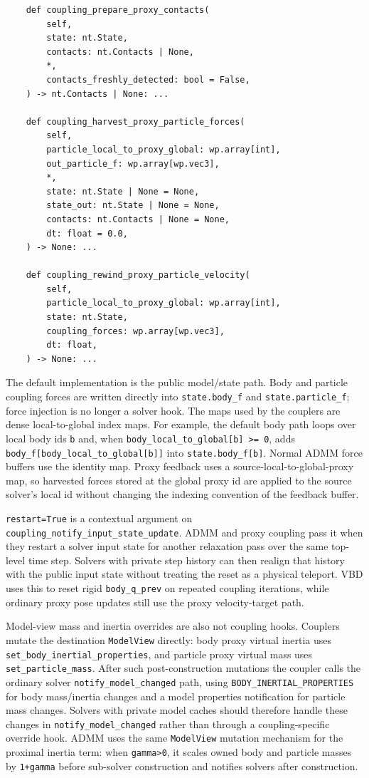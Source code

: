 \documentclass[11pt]{article}
\begin{document}
\begin{verbatim}
    def coupling_prepare_proxy_contacts(
        self,
        state: nt.State,
        contacts: nt.Contacts | None,
        *,
        contacts_freshly_detected: bool = False,
    ) -> nt.Contacts | None: ...

    def coupling_harvest_proxy_particle_forces(
        self,
        particle_local_to_proxy_global: wp.array[int],
        out_particle_f: wp.array[wp.vec3],
        *,
        state: nt.State | None = None,
        state_out: nt.State | None = None,
        contacts: nt.Contacts | None = None,
        dt: float = 0.0,
    ) -> None: ...

    def coupling_rewind_proxy_particle_velocity(
        self,
        particle_local_to_proxy_global: wp.array[int],
        state: nt.State,
        coupling_forces: wp.array[wp.vec3],
        dt: float,
    ) -> None: ...

\end{verbatim}

The default implementation is the public model/state path. Body and particle
coupling forces are written directly into \texttt{state.body\_f} and
\texttt{state.particle\_f}; force injection is no longer a solver hook.  The maps
used by the couplers are dense local-to-global index maps.  For example, the
default body path loops over local body ids \texttt{b} and, when
\texttt{body\_local\_to\_global[b] >= 0}, adds
\texttt{body\_f[body\_local\_to\_global[b]]} into \texttt{state.body\_f[b]}.
Normal ADMM force buffers use the identity map. Proxy feedback uses a
source-local-to-global-proxy map, so harvested forces stored at the global proxy
id are applied to the source solver's local id without changing the indexing
convention of the feedback buffer.

\texttt{restart=True} is a contextual argument on
\texttt{coupling\_notify\_input\_state\_update}.  ADMM and proxy coupling pass it
when they restart a solver input state for another relaxation pass over the same
top-level time step.  Solvers with private step history can then realign that
history with the public input state without treating the reset as a physical
teleport.  VBD uses this to reset rigid \texttt{body\_q\_prev} on repeated
coupling iterations, while ordinary proxy pose updates still use the proxy
velocity-target path.

Model-view mass and inertia overrides are also not coupling hooks.  Couplers
mutate the destination \texttt{ModelView} directly: body proxy virtual inertia
uses \texttt{set\_body\_inertial\_properties}, and particle proxy virtual mass
uses \texttt{set\_particle\_mass}.  After such post-construction mutations the
coupler calls the ordinary solver \texttt{notify\_model\_changed} path, using
\texttt{BODY\_INERTIAL\_PROPERTIES} for body mass/inertia changes and a model
properties notification for particle mass changes. Solvers with private model
caches should therefore handle these changes in \texttt{notify\_model\_changed}
rather than through a coupling-specific override hook. ADMM uses the same
\texttt{ModelView} mutation mechanism for the proximal inertia term: when
\texttt{gamma>0}, it scales owned body and particle masses by \texttt{1+gamma}
before sub-solver construction and notifies solvers after construction.
\end{document}
